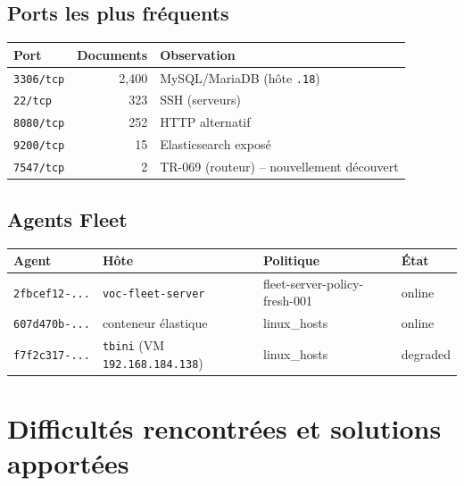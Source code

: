 \documentclass[11pt,a4paper]{article}
\begin{document}
\subsection{Ports les plus fr\'equents}

\begin{center}
\small
\begin{tabularx}{\linewidth}{@{}l r X@{}}
\toprule
\textbf{Port} & \textbf{Documents} & \textbf{Observation} \\
\midrule
\texttt{3306/tcp} & 2{,}400 & MySQL/MariaDB (h\^ote \texttt{.18}) \\
\texttt{22/tcp} & 323 & SSH (serveurs) \\
\texttt{8080/tcp} & 252 & HTTP alternatif \\
\texttt{9200/tcp} & 15 & Elasticsearch expos\'e \\
\texttt{7547/tcp} & 2 & TR-069 (routeur) -- nouvellement d\'ecouvert \\
\bottomrule
\end{tabularx}
\end{center}

\subsection{Agents Fleet}

\begin{center}
\small
\begin{tabularx}{\linewidth}{@{}l l l X@{}}
\toprule
\textbf{Agent} & \textbf{H\^ote} & \textbf{Politique} & \textbf{\'Etat} \\
\midrule
\texttt{2fbcef12-...} & \texttt{voc-fleet-server} & fleet-server-policy-fresh-001 & \textcolor{vocgreen}{online} \\
\texttt{607d470b-...} & conteneur \'elastique & linux\_hosts & \textcolor{vocgreen}{online} \\
\texttt{f7f2c317-...} & \texttt{tbini} (VM \texttt{192.168.184.138}) & linux\_hosts & \textcolor{vocorange}{degraded} \\
\bottomrule
\end{tabularx}
\end{center}

\clearpage

\section{Difficult\'es rencontr\'ees et solutions apport\'ees}
\end{document}

